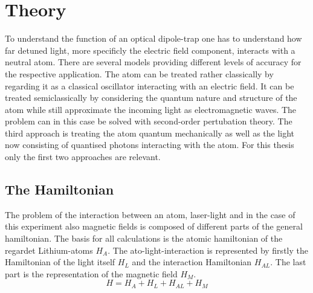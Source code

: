 \chapter{Theory}

To understand the function of an optical dipole-trap one has to understand how far detuned light, more specificly the electric field component, interacts with a neutral atom. There are several models providing different levels of accuracy for the respective application. The atom can be treated rather classically by regarding it as a classical oscillator interacting with an electric field. It can be treated semiclassically by considering the quantum nature and structure of the atom while still approximate the incoming light as electromagnetic waves. The problem can in this case be solved with second-order pertubation theory. The third approach is treating the atom quantum mechanically as well as the light now consisting of quantised photons interacting with the atom. For this thesis only the first two approaches are relevant.

\section{The Hamiltonian}

The problem of the interaction between an atom, laser-light and in the case of this experiment also magnetic fields is composed of different parts of the general hamiltonian. The basis for all calculations is the atomic hamiltonian of the regardet Lithium-atoms $H_A$. The ato-light-interaction is represented by firstly the Hamiltonian of the light itself $H_L$ and the interaction Hamiltonian $H_{AL}$. The last part is the representation of the magnetic field $H_M$.
\begin{equation}
H=H_A+H_L+H_{AL}+H_{M}
\end{equation}\label{hamiltonian}

